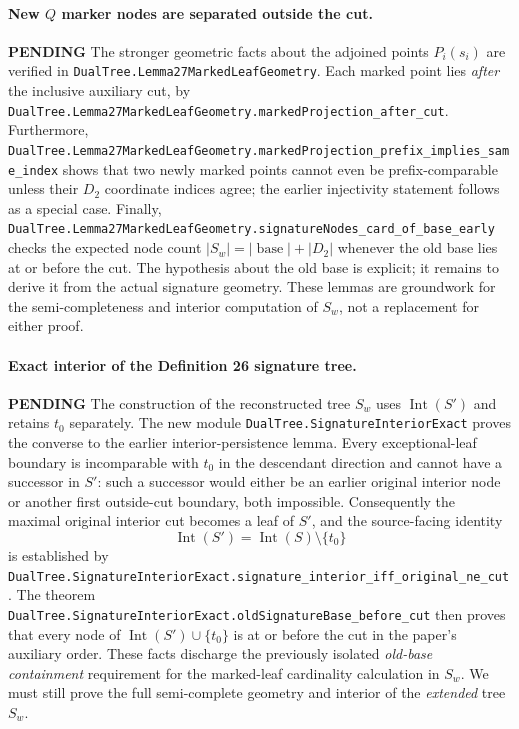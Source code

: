\documentclass[11pt]{article}
\newcommand{\todo}{\textcolor{gray!70!black}{\textbf{PENDING}}}
\newcommand{\lean}[1]{\texttt{#1}}
\begin{document}
\paragraph{New $Q$ marker nodes are separated outside the cut.} \todo
The stronger geometric facts about the adjoined points $P_i(s_i)$
are verified in \lean{DualTree.Lemma27MarkedLeafGeometry}.
Each marked point lies \emph{after} the inclusive auxiliary cut,
by \lean{DualTree.Lemma27MarkedLeafGeometry.markedProjection_after_cut}.
Furthermore,
\lean{DualTree.Lemma27MarkedLeafGeometry.markedProjection_prefix_implies_same_index}
shows that two newly marked points cannot even be prefix-comparable
unless their $D_2$ coordinate indices agree; the earlier injectivity
statement follows as a special case.  Finally,
\lean{DualTree.Lemma27MarkedLeafGeometry.signatureNodes_card_of_base_early}
checks the expected node count
$|S_w|=|\operatorname{base}|+|D_2|$ whenever the old base lies at or
before the cut.  The hypothesis about the old base is explicit;
it remains to derive it from the actual signature geometry.
These lemmas are groundwork for the semi-completeness and
interior computation of $S_w$, not a replacement for either proof.

\paragraph{Exact interior of the Definition 26 signature tree.} \todo
The construction of the reconstructed tree $S_w$ uses
$\operatorname{Int}(S')$ and retains $t_0$ separately.
The new module \lean{DualTree.SignatureInteriorExact} proves the
converse to the earlier interior-persistence lemma.
Every exceptional-leaf boundary is incomparable with $t_0$ in
the descendant direction and cannot have a successor in $S'$:
such a successor would either be an earlier original interior
node or another first outside-cut boundary, both impossible.
Consequently the maximal original interior cut becomes a leaf
of $S'$, and the source-facing identity
\[
\operatorname{Int}(S')
 =\operatorname{Int}(S)\setminus\{t_0\}
\]
is established by
\lean{DualTree.SignatureInteriorExact.signature_interior_iff_original_ne_cut}.
The theorem
\lean{DualTree.SignatureInteriorExact.oldSignatureBase_before_cut}
then proves that every node of
$\operatorname{Int}(S')\cup\{t_0\}$ is at or before the cut in
the paper's auxiliary order.
These facts discharge the previously isolated \emph{old-base
containment} requirement for the marked-leaf cardinality calculation
in $S_w$.  We must still prove the full semi-complete geometry and
interior of the \emph{extended} tree $S_w$.
\end{document}
